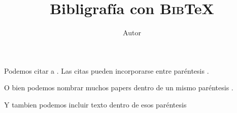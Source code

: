 \documentclass[12pt,a4paper]{article}
\author{Autor}
\title{Bibligrafía con \textsc{Bib}\TeX{}}
\begin{document}
\maketitle

Podemos citar a \citet{Wegener1966}. Las citas pueden incorporarse entre paréntesis \citep{Higgs1964}.

O bien podemos nombrar muchos papers dentro de un mismo paréntesis \citep{Wegener1966, Higgs1964}.

Y tambien podemos incluir texto dentro de esos paréntesis \citep[e.g.][]{Wegener1966, Higgs1964}



\end{document}
